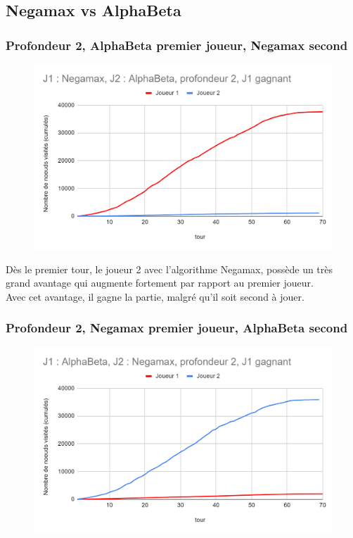 \documentclass[12pt]{article}
\begin{document}
\newpage
\subsection{Negamax vs AlphaBeta}

\subsubsection{Profondeur 2, AlphaBeta premier joueur, Negamax second}

\begin{figure}[!h]
   \includegraphics[width=\textwidth]{prof2alphaVSnegamax.png}
\end{figure}

Dès le premier tour, le joueur 2 avec l'algorithme Negamax, possède un très grand avantage qui augmente fortement par rapport au premier joueur.\\
Avec cet avantage, il gagne la partie, malgré qu'il soit second à jouer.

\newpage
\subsubsection{Profondeur 2, Negamax premier joueur, AlphaBeta second}

\begin{figure}[!h]
   \includegraphics[width=\textwidth]{prof2negamaxVSalpha.png}
\end{figure}
\end{document}
